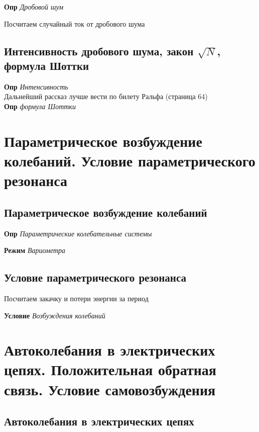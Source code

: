 \documentclass[a4paper, 14pt]{article}
\begin{document}
    \textbf{Опр} \textit{Дробовой шум}
    
    Посчитаем случайный ток от дробового шума
    
    \subsection{Интенсивность дробового шума, закон $\sqrt{N}$, формула Шоттки}
    
    \textbf{Опр} \textit{Интенсивность} \\
    
    Дальнейший рассказ лучше вести по билету Ральфа (страница 64) \\
    
    \textbf{Опр} \textit{формула Шоттки}
    
    \section{Параметрическое возбуждение колебаний.
    Условие параметрического резонанса}
    
    \subsection{Параметрическое возбуждение колебаний}
    
    \textbf{Опр} \textit{Параметрические колебательные системы}
    
    \textbf{Режим} \textit{Вариометра}
    
    \subsection{Условие параметрического резонанса}
    
    Посчитаем закачку и потери энергии за период
    
    \textbf{Условие} \textit{Возбуждения колебаний}
    
    \section{Автоколебания в электрических цепях.
    Положительная обратная связь.
    Условие самовозбуждения}
    
    \subsection{Автоколебания в электрических цепях}
    
\end{document}
